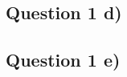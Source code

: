 \documentclass[a4paper, twocolumn]{article}
\def\citation{{\bfseries (Annon, dd/mm/yyyy)}}
\begin{document}
\subsection*{Question 1 d)}

\subsection*{Question 1 e)}

        
%
%
%
%
%
%
%
%
\end{document}
